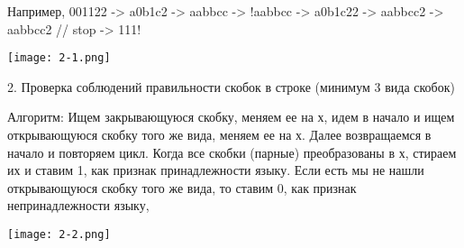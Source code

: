 \documentclass{article}
\begin{document}
Например, 001122 -> a0b1c2 -> aabbcc -> !aabbcc
 ->  a0b1c22 -> aabbcc2 -> aabbcc2 // stop
 -> 111!

\texttt{[image: 2-1.png]}


2. Проверка соблюдений правильности скобок в строке (минимум 3 вида скобок)

Алгоритм:
Ищем закрывающуюся скобку, меняем ее на х, идем в начало и ищем открывающуюся скобку того же вида, меняем ее на х. Далее возвращаемся в начало и повторяем цикл. Когда все скобки (парные) преобразованы в х, стираем их и ставим 1, как признак принадлежности языку. Если есть мы не нашли открывающуюся скобку того же вида, то ставим 0, как признак непринадлежности языку,

\texttt{[image: 2-2.png]}
\end{document}
